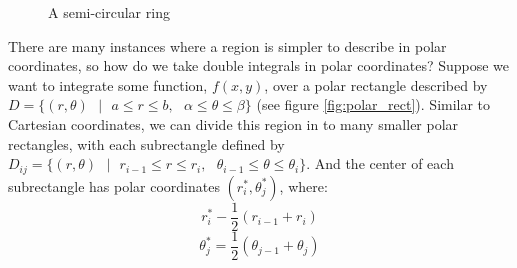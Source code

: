 \begin{figure}[htbp]
    \centering
    \caption{A semi-circular ring}
    \label{fig:semicircle}
\end{figure}

There are many instances where a region is simpler to describe in polar 
coordinates, so how do we take double integrals in polar coordinates? Suppose 
we want to integrate some function, $f(x,y)$, over a polar rectangle described 
by $\textit{D} = \{(r, \theta)\text{ }|\text{ }a \leq r \leq b,\text{ }\alpha 
\leq \theta \leq \beta \}$ (see figure \ref{fig:polar_rect}). Similar to 
Cartesian coordinates, we can divide this region in to many smaller polar 
rectangles, with each subrectangle defined by $\textit{D}_{ij} = \{(r, \theta)
\text{ }|\text{ }r_{i-1} \leq r \leq r_i,\text{ }\theta_{i - 1} \leq \theta 
\leq \theta_i\}$. And the center of each subrectangle has polar coordinates $(
r_i^*, \theta_j^*)$, where:
$$r_i^* - \frac{1}{2} \left( r_{i - 1} + r_i \right)$$
$$\theta_j^* = \frac{1}{2} \left( \theta_{j - 1} + \theta_j \right)$$ 

